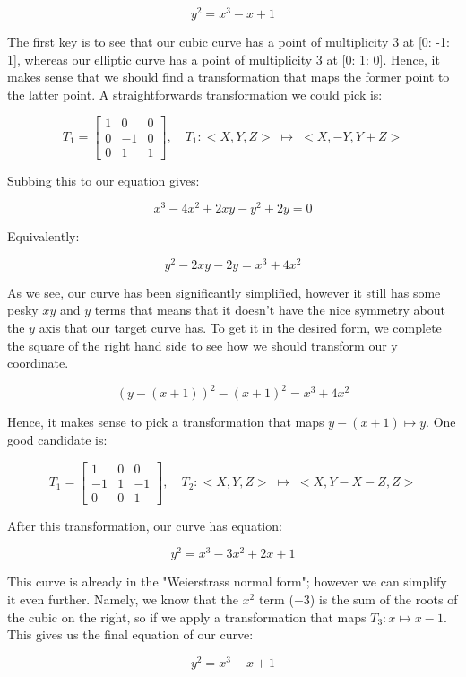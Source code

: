 \documentclass{article}
\begin{document}
\[y^2 = x^3 - x + 1\]

The first key is to see that our cubic curve has a point of multiplicity $3$ at [0: -1: 1], whereas our elliptic curve has a point of multiplicity $3$ at [0: 1: 0]. Hence, it makes sense that we should find a transformation that maps the former point to the latter point. A straightforwards transformation we could pick is:

\[ T_1 = \begin{bmatrix}
    1 & 0 & 0\\
    0 & -1 & 0\\
    0 & 1 & 1
\end{bmatrix},
\quad
T_1: <X, Y, Z> \; \mapsto \; <X, -Y, Y + Z>
\]

Subbing this to our equation gives:

\[x^{3} - 4 x^{2} + 2 x y - y^{2} + 2 y = 0\]

Equivalently:

\[y^2 - 2 x y - 2y = x^3 + 4x^2\]

As we see, our curve has been significantly simplified, however it still has some pesky $xy$ and $y$ terms that means that it doesn't have the nice symmetry about the $y$ axis that our target curve has. To get it in the desired form, we complete the square of the right hand side to see how we should transform our y coordinate.

\[(y - (x + 1))^2 - (x + 1)^2 = x^3 + 4x^2\]

Hence, it makes sense to pick a transformation that maps $y - (x + 1) \mapsto y$. One good candidate is:

\[ T_1 = \begin{bmatrix}
    1  & 0 & 0\\
    -1 & 1 & -1\\
    0  & 0 & 1
\end{bmatrix},
\quad
T_2: <X, Y, Z> \; \mapsto \; <X, Y - X - Z, Z>
\]

After this transformation, our curve has equation:

\[y^{2} = x^{3} - 3 x^{2} + 2 x  + 1\]

This curve is already in the "Weierstrass normal form"; however we can simplify it even further. Namely, we know that the $x^2$ term ($-3$) is the sum of the roots of the cubic on the right, so if we apply a transformation that maps $T_3: x \mapsto x - 1$. This gives us the final equation of our curve:

\[y^{2} = x^{3} - x  + 1\]
\end{document}
